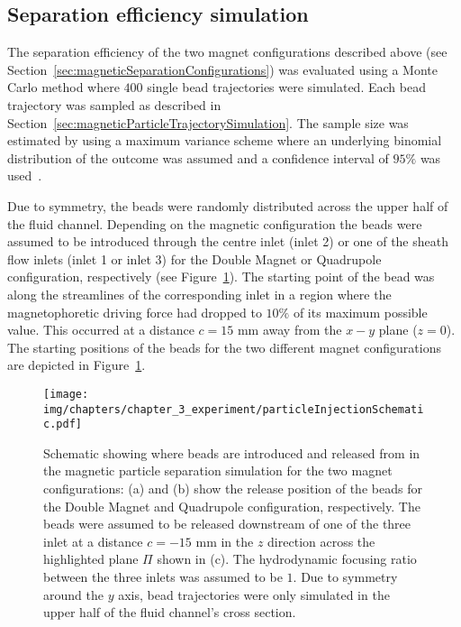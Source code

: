 \subsection{Separation efficiency simulation}\label{subsec:separationEfficiencySimulation}
The separation efficiency of the two magnet configurations described above (see Section~\ref{sec:magneticSeparationConfigurations}) was evaluated using a Monte Carlo method where $400$ single bead trajectories were simulated. Each bead trajectory was sampled as described in Section~\ref{sec:magneticParticleTrajectorySimulation}. The sample size was estimated by using a maximum variance scheme where an underlying binomial distribution of the outcome was assumed and a confidence interval of $95\%$ was used~\cite{Kreyszig2006}. 

Due to symmetry, the beads were randomly distributed across the upper half of the fluid channel. Depending on the magnetic configuration the beads were assumed to be introduced through the centre inlet (inlet 2) or one of the sheath flow inlets (inlet 1 or inlet 3) for the Double Magnet or Quadrupole configuration, respectively (see Figure~\ref{fig:particleTrajectoryReleasePositions}). The starting point of the bead was along the streamlines of the corresponding inlet in a region where the magnetophoretic driving force had dropped to $10\%$ of its maximum possible value. This occurred at a distance $c=15$ mm away from the $x-y$ plane ($z=0$). The starting positions of the beads for the two different magnet configurations are depicted in Figure~\ref{fig:particleTrajectoryReleasePositions}.

\begin{figure}[htb]
        \centering
        \texttt{[image: img/chapters/chapter\_3\_experiment/particleInjectionSchematic.pdf]}
        \caption[Schematic of the bead trajectory starting points for the magnetic particle separation simulation]{Schematic showing where beads are introduced and released from in the magnetic particle separation simulation for the two magnet configurations: (a) and (b) show the release position of the beads for the Double Magnet and Quadrupole configuration, respectively. The beads were assumed to be released downstream of one of the three inlet at a distance $c=-15$ mm in the $z$ direction across the highlighted plane $\Pi$ shown in (c). The hydrodynamic focusing ratio between the three inlets was assumed to be $1$. Due to symmetry around the $y$ axis, bead trajectories were only simulated in the upper half of the fluid channel's cross section.}
        \label{fig:particleTrajectoryReleasePositions}
\end{figure}

